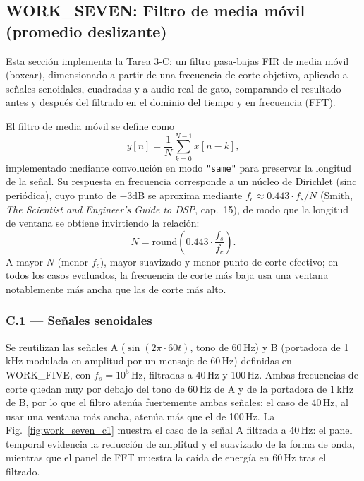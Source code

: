
\subsection{WORK\_SEVEN: Filtro de media móvil (promedio deslizante)}

Esta sección implementa la Tarea 3-C: un filtro pasa-bajas FIR de media móvil (boxcar), dimensionado a partir de una frecuencia de corte objetivo, aplicado a señales senoidales, cuadradas y a audio real de gato, comparando el resultado antes y después del filtrado en el dominio del tiempo y en frecuencia (FFT).

El filtro de media móvil se define como
\begin{equation}
y[n] = \frac{1}{N}\sum_{k=0}^{N-1} x[n-k],
\end{equation}
implementado mediante convolución en modo \texttt{"same"} para preservar la longitud de la señal. Su respuesta en frecuencia corresponde a un núcleo de Dirichlet (sinc periódica), cuyo punto de $-3$dB se aproxima mediante $f_c \approx 0.443 \cdot f_s / N$ (Smith, \emph{The Scientist and Engineer's Guide to DSP}, cap.\ 15), de modo que la longitud de ventana se obtiene invirtiendo la relación:
\begin{equation}
N = \text{round}\left(0.443 \cdot \frac{f_s}{f_c}\right).
\end{equation}
A mayor $N$ (menor $f_c$), mayor suavizado y menor punto de corte efectivo; en todos los casos evaluados, la frecuencia de corte más baja usa una ventana notablemente más ancha que las de corte más alto.

\subsubsection{C.1 — Señales senoidales}

Se reutilizan las señales A ($\sin(2\pi \cdot 60t)$, tono de 60\,Hz) y B (portadora de 1\,kHz modulada en amplitud por un mensaje de 60\,Hz) definidas en WORK\_FIVE, con $f_s = 10^5$\,Hz, filtradas a 40\,Hz y 100\,Hz. Ambas frecuencias de corte quedan muy por debajo del tono de 60\,Hz de A y de la portadora de 1\,kHz de B, por lo que el filtro atenúa fuertemente ambas señales; el caso de 40\,Hz, al usar una ventana más ancha, atenúa más que el de 100\,Hz. La Fig.~\ref{fig:work_seven_c1} muestra el caso de la señal A filtrada a 40\,Hz: el panel temporal evidencia la reducción de amplitud y el suavizado de la forma de onda, mientras que el panel de FFT muestra la caída de energía en 60\,Hz tras el filtrado.

